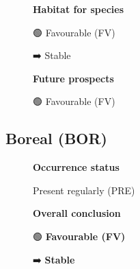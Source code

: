 \documentclass[
  10pt,
  letterpaper,
  DIV=11,
  numbers=noendperiod]{scrartcl}
\begin{document}
\begin{figure}

\begin{minipage}{0.33\linewidth}
\textbf{Habitat for species}\end{minipage}%
%
\begin{minipage}{0.44\linewidth}
🟢 Favourable (FV)\end{minipage}%
%
\begin{minipage}{0.22\linewidth}
➡️ Stable\end{minipage}%

\end{figure}%

\begin{figure}

\begin{minipage}{0.33\linewidth}
\textbf{Future prospects}\end{minipage}%
%
\begin{minipage}{0.44\linewidth}
🟢 Favourable (FV)\end{minipage}%
%
\begin{minipage}{0.22\linewidth}
\end{minipage}%

\end{figure}%

\subsection{Boreal (BOR)}\label{boreal-bor}

\begin{figure}

\begin{minipage}{0.33\linewidth}
\textbf{Occurrence status}\end{minipage}%
%
\begin{minipage}{0.44\linewidth}
Present regularly (PRE)\end{minipage}%
%
\begin{minipage}{0.22\linewidth}
\end{minipage}%

\end{figure}%

\begin{figure}

\begin{minipage}{0.33\linewidth}
\textbf{Overall conclusion}\end{minipage}%
%
\begin{minipage}{0.44\linewidth}
🟢 \textbf{Favourable (FV)}\end{minipage}%
%
\begin{minipage}{0.22\linewidth}
➡️ \textbf{Stable}\end{minipage}%

\end{figure}%
\end{document}
